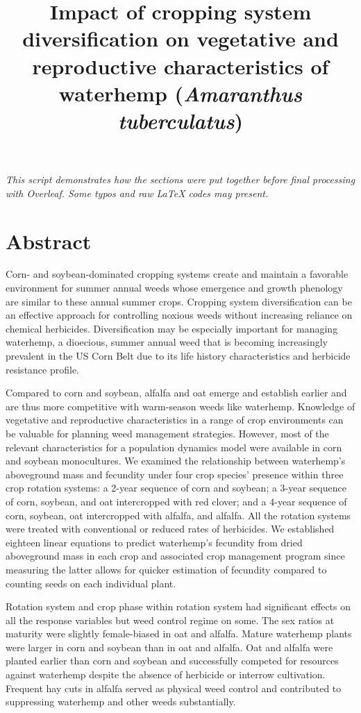 \documentclass[
]{article}
\title{Impact of cropping system diversification on vegetative and reproductive characteristics of waterhemp (\emph{Amaranthus tuberculatus})}
\author{}
\date{\vspace{-2.5em}}
\begin{document}
\maketitle

\emph{This script demonstrates how the sections were put together before final processing with Overleaf. Some typos and raw LaTeX codes may present.}

\hypertarget{abstract}{%
\section*{Abstract}\label{abstract}}

Corn- and soybean-dominated cropping systems create and maintain a favorable environment for summer annual weeds whose emergence and growth phenology are similar to these annual summer crops. Cropping system diversification can be an effective approach for controlling noxious weeds without increasing reliance on chemical herbicides. Diversification may be especially important for managing waterhemp, a dioecious, summer annual weed that is becoming increasingly prevalent in the US Corn Belt due to its life history characteristics and herbicide resistance profile.

Compared to corn and soybean, alfalfa and oat emerge and establish earlier and are thus more competitive with warm-season weeds like waterhemp. Knowledge of vegetative and reproductive characteristics in a range of crop environments can be valuable for planning weed management strategies. However, most of the relevant characteristics for a population dynamics model were available in corn and soybean monocultures. We examined the relationship between waterhemp's aboveground mass and fecundity under four crop species' presence within three crop rotation systems: a 2-year sequence of corn and soybean; a 3-year sequence of corn, soybean, and oat intercropped with red clover; and a 4-year sequence of corn, soybean, oat intercropped with alfalfa, and alfalfa. All the rotation systems were treated with conventional or reduced rates of herbicides. We established eighteen linear equations to predict waterhemp's fecundity from dried aboveground mass in each crop and associated crop management program since measuring the latter allows for quicker estimation of fecundity compared to counting seeds on each individual plant.

Rotation system and crop phase within rotation system had significant effects on all the response variables but weed control regime on some. The sex ratios at maturity were slightly female-biased in oat and alfalfa. Mature waterhemp plants were larger in corn and soybean than in oat and alfalfa. Oat and alfalfa were planted earlier than corn and soybean and successfully competed for resources against waterhemp despite the absence of herbicide or interrow cultivation. Frequent hay cuts in alfalfa served as physical weed control and contributed to suppressing waterhemp and other weeds substantially.
\end{document}
